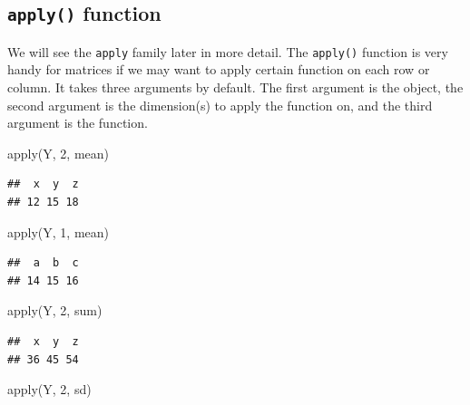 \documentclass[
]{book}
\newenvironment{Shaded}{\begin{snugshade}}{\end{snugshade}}
\newcommand{\DecValTok}[1]{\textcolor[rgb]{0.00,0.00,0.81}{#1}}
\newcommand{\FunctionTok}[1]{\textcolor[rgb]{0.00,0.00,0.00}{#1}}
\newcommand{\NormalTok}[1]{#1}
\begin{document}
\hypertarget{apply-function}{%
\subsection{\texorpdfstring{\texttt{apply()} function}{apply() function}}\label{apply-function}}

We will see the \texttt{apply} family later in more detail. The \texttt{apply()} function is very handy for matrices if we may want to apply certain function on each row or column. It takes three arguments by default. The first argument is the object, the second argument is the dimension(s) to apply the function on, and the third argument is the function.

\begin{Shaded}
\begin{Highlighting}[]
\FunctionTok{apply}\NormalTok{(Y, }\DecValTok{2}\NormalTok{, mean)}
\end{Highlighting}
\end{Shaded}

\begin{verbatim}
##  x  y  z 
## 12 15 18
\end{verbatim}

\begin{Shaded}
\begin{Highlighting}[]
\FunctionTok{apply}\NormalTok{(Y, }\DecValTok{1}\NormalTok{, mean)}
\end{Highlighting}
\end{Shaded}

\begin{verbatim}
##  a  b  c 
## 14 15 16
\end{verbatim}

\begin{Shaded}
\begin{Highlighting}[]
\FunctionTok{apply}\NormalTok{(Y, }\DecValTok{2}\NormalTok{, sum)}
\end{Highlighting}
\end{Shaded}

\begin{verbatim}
##  x  y  z 
## 36 45 54
\end{verbatim}

\begin{Shaded}
\begin{Highlighting}[]
\FunctionTok{apply}\NormalTok{(Y, }\DecValTok{2}\NormalTok{, sd)}
\end{Highlighting}
\end{Shaded}
\end{document}
